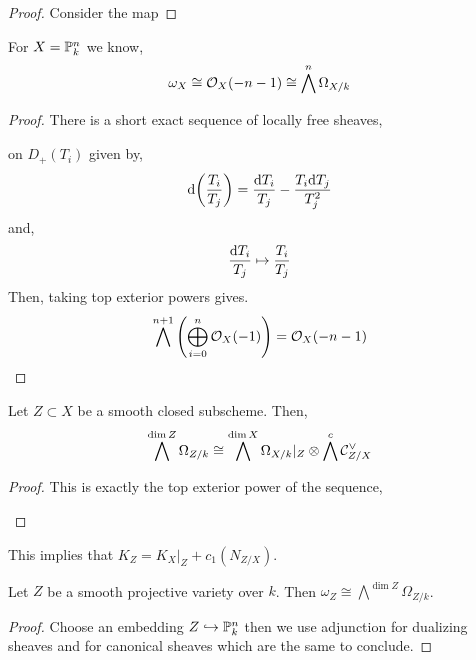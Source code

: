 \documentclass[12pt]{article}
\begin{document}
\begin{proof}
Consider the map 
\end{proof}

\begin{prop}
For $X = \P^n_k$ we know,
\[ \omega_X \cong \struct{X}(-n-1) \cong \bigwedge^n \Omega_{X/k} \]
\end{prop}

\begin{proof}
There is a short exact sequence of locally free sheaves,
\begin{center}
\end{center}
on $D_+(T_i)$ given by,
\[ \d{ \left( \frac{T_i}{T_j} \right) } = \frac{\d{T_i}}{T_j} - \frac{T_i \d{T_j}}{T_j^2} \]
and,
\[ \frac{\d{T_i}}{T_j} \mapsto \frac{T_i}{T_j} \]
Then, taking top exterior powers gives.
\[ \bigwedge^{n+1} \left( \bigoplus_{i = 0}^n \struct{X}(-1) \right) = \struct{X}(-n - 1) \]
\end{proof}

\begin{lemma}[Adjunction]
Let $Z \subset X$ be a smooth closed subscheme. Then,
\[ \bigwedge^{\dim{Z}} \Omega_{Z/k} \cong \bigwedge^{\dim{X}} \Omega_{X/k} |_Z \otimes \bigwedge^c \C^\vee_{Z/X} \]
\end{lemma}

\begin{proof}
This is exactly the top exterior power of the sequence,
\begin{center}
\end{center}
\end{proof}

\begin{rmk}
This implies that $K_Z = K_X |_Z + c_1(N_{Z/X})$. 
\end{rmk}

\begin{theorem}
Let $Z$ be a smooth projective variety over $k$. Then $\omega_Z \cong \bigwedge^{\dim{Z}} \Omega_{Z/k}$.
\end{theorem}

\begin{proof}
Choose an embedding $Z \embed \P^n_k$ then we use adjunction for dualizing sheaves and for canonical sheaves which are the same to conclude. 
\end{proof}
\end{document}
